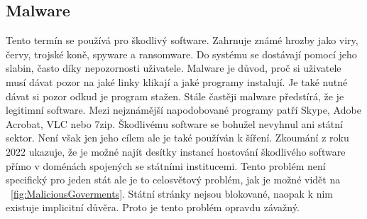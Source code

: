 \subsection{Malware}\label{subsec:malware}
Tento termín se používá pro škodlivý software.
Zahrnuje známé hrozby jako viry, červy, trojské koně, spyware a ransomware.
Do systému se dostávají pomocí jeho slabin, často díky nepozornosti uživatele.\cite{cisco_most_common_attack}
Malware je důvod, proč si uživatele musí dávat pozor na jaké linky klikají a jaké programy instalují.
Je také nutné dávat si pozor odkud je program stažen.
Stále častěji malware předstírá, že je legitimní software.
Mezi nejznámější napodobované programy patří Skype, Adobe Acrobat, VLC nebo 7zip.\cite{virustotal_report_findings}
Škodlivému software se bohužel nevyhnul ani státní sektor.
Není však jen jeho cílem ale je také používán k šíření.
Zkoumání z roku 2022 ukazuje, že je možné najít desítky instancí hostování škodlivého software přímo v doménách spojených se státními institucemi.\cite{virustotal_report_findings_goverment}
Tento problém není specifický pro jeden stát ale je to celosvětový problém, jak je možné vidět na ~\ref{fig:MaliciousGoverments}.
Státní stránky nejsou blokované, naopak k nim existuje implicitní důvěra.
Proto je tento problém opravdu závažný.
~

